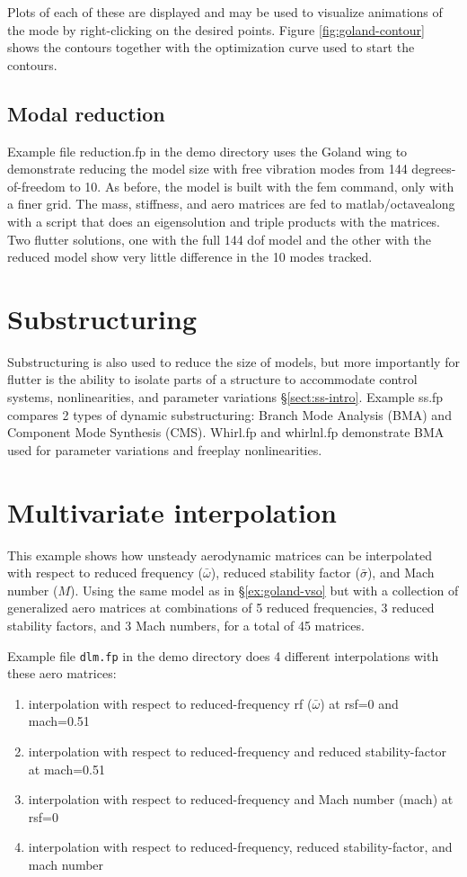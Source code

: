 \documentclass[11pt,openany,twoside]{book}
\numberwithin{equation}{section}		%
\newcommand{\Cmd}[1]{{\sf #1}}
\newcommand{\Code}[1]{{\small\tt #1}}
\newcommand{\Octlab}{\Cmd{matlab}/\Cmd{octave}\:}
\newcommand{\Sectref}[1]{\S\ref{#1}}
\begin{document}
Plots of each of these are displayed and may be used to visualize animations
of the mode by right-clicking on the desired points.
Figure \ref{fig:goland-contour} shows the contours together with the optimization
curve used to start the contours.

\subsection{Modal reduction}\label{ex:reduction}
Example file reduction.fp in the demo directory uses the Goland wing to
demonstrate reducing the model size with free vibration modes from 144
degrees-of-freedom to 10. As before, the model is built with the \Cmd{fem}
command, only with a finer grid. The mass, stiffness, and aero matrices
are fed to \Octlab along with a script that does an eigensolution and
triple products with the matrices. Two flutter solutions, one with the
full 144 dof model and the other with the reduced model show very little
difference in the 10 modes tracked.

\section{Substructuring}\label{ex:substructure}
Substructuring is also used to reduce the size of models, but more
importantly for flutter is the ability to isolate parts of a structure
to accommodate control systems, nonlinearities, and parameter variations
\Sectref{sect:ss-intro}.
Example ss.fp compares 2 types of dynamic substructuring: Branch Mode
Analysis (BMA) and Component Mode Synthesis (CMS).
Whirl.fp and whirlnl.fp demonstrate BMA used for parameter variations
and freeplay nonlinearities.

\section{Multivariate interpolation}\label{ex:dlm.fp}
This example shows how unsteady aerodynamic matrices can be interpolated
with respect to reduced frequency ($\bar{\omega}$),
reduced stability factor ($\bar{\sigma}$), and Mach number ($M$).
Using the same model as in \Sectref{ex:goland-vso} but with a collection of
generalized aero matrices at combinations of
5 reduced frequencies,
3 reduced stability factors,
and 3 Mach numbers, for a total of 45 matrices.

Example file \Code{dlm.fp} in the demo directory does 4 different interpolations
with these aero matrices:
\begin{enumerate}
\item interpolation with respect to reduced-frequency rf
	($\bar{\omega}$) at rsf=0 and mach=0.51
\item interpolation with respect to reduced-frequency and
	reduced stability-factor at mach=0.51
\item interpolation with respect to reduced-frequency and
	 Mach number (mach) at rsf=0
\item interpolation with respect to reduced-frequency,
	 reduced stability-factor, and mach number
\end{enumerate}
\end{document}
